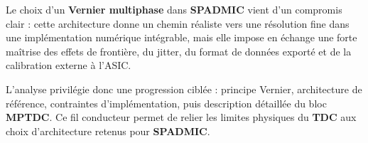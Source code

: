 \begin{summaryBox}
Le choix d'un \textbf{Vernier multiphase} dans \textbf{SPADMIC} vient d'un compromis clair : cette architecture donne un chemin réaliste vers une résolution fine dans une implémentation numérique intégrable, mais elle impose en échange une forte maîtrise des effets de frontière, du jitter, du format de données exporté et de la calibration externe à l'ASIC.
\end{summaryBox}

L'analyse privilégie donc une progression ciblée : principe Vernier, architecture de référence, contraintes d'implémentation, puis description détaillée du bloc \textbf{MPTDC}. Ce fil conducteur permet de relier les limites physiques du \textbf{TDC} aux choix d'architecture retenus pour \textbf{SPADMIC}.

\clearpage
